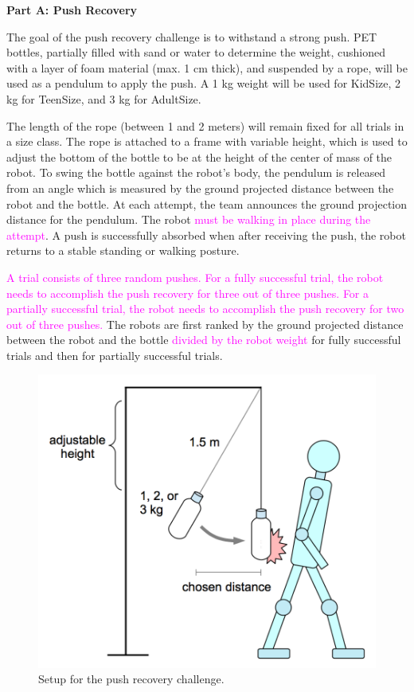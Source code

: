 \clearpage
\sffamily
{\bfseries\color[rgb]{0.4,0.4,0.4}
Part A: Push Recovery }

\bigskip

The goal of the push recovery challenge is to withstand a strong push. PET bottles, partially filled with sand or water to determine the weight, cushioned with a layer of foam material (max. 1 cm thick), and suspended by a rope, will be used as a pendulum to apply the push. A 1 kg weight will be used for KidSize, 2 kg for TeenSize, and 3 kg for AdultSize. 

The length of the rope (between 1 and 2 meters) will remain fixed for all trials in a size class. The rope is attached to a frame with variable height, which is used to adjust the bottom of the bottle to be at the height of the center of mass of the robot. To swing the bottle against the robot's body, the pendulum is released from an angle which is measured by the ground projected distance between the robot and the bottle. At each attempt, the team announces the ground projection distance for the pendulum. The robot \textcolor{magenta}{must be walking in place during the attempt}. A push is successfully absorbed when after receiving the push, the robot returns to a stable standing or walking posture. 

\textcolor{magenta}{A trial consists of three random pushes. For a fully successful trial, the robot needs to accomplish the push recovery for three out of three pushes. For a partially successful trial, the robot needs to accomplish the push recovery for two out of three pushes.} The robots are first ranked by the ground projected distance between the robot and the bottle \textcolor{magenta}{divided by the robot weight} for fully successful trials and then for partially successful trials.

\begin{figure}[h]
\begin{center}
\includegraphics[scale=1.0]{img/push_recovery.png}
\caption{Setup for the push recovery challenge. }
\end{center}
\end{figure}